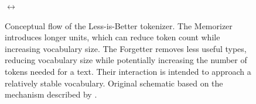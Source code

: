 \begin{figure}[htbp]
    \begin{minipage}[c]{0.36\textwidth}
        \centering
    \end{minipage}
    \(\longleftrightarrow\)
    \begin{minipage}[c]{0.36\textwidth}
        \centering
    \end{minipage}

    \caption{Conceptual flow of the Less-is-Better tokenizer. The Memorizer introduces longer units, which can reduce token count while increasing vocabulary size. The Forgetter removes less useful types, reducing vocabulary size while potentially increasing the number of tokens needed for a text. Their interaction is intended to approach a relatively stable vocabulary. Original schematic based on the mechanism described by \textcite{yang2024rethinking}.}
    \label{fig:tokenizer-lib-model}
\end{figure}
